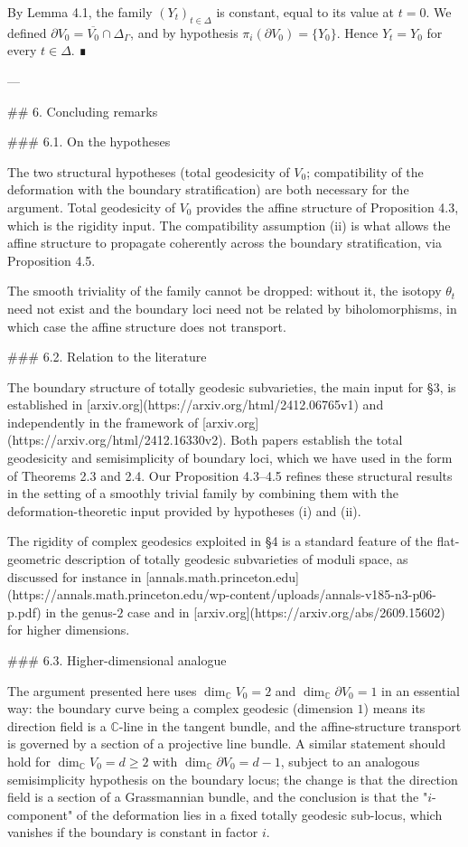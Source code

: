 By Lemma 4.1, the family $(Y_t)_{t \in \Delta}$ is constant, equal to its value at $t = 0$. We defined $\partial V_0 = \overline{V_0} \cap \Delta_\Gamma$, and by hypothesis $\pi_i(\partial V_0) = \{Y_0\}$. Hence $Y_t = Y_0$ for every $t \in \Delta$. ∎

---

## 6. Concluding remarks

### 6.1. On the hypotheses

The two structural hypotheses (total geodesicity of $V_0$; compatibility of the deformation with the boundary stratification) are both necessary for the argument. Total geodesicity of $V_0$ provides the affine structure of Proposition 4.3, which is the rigidity input. The compatibility assumption (ii) is what allows the affine structure to propagate coherently across the boundary stratification, via Proposition 4.5.

The smooth triviality of the family cannot be dropped: without it, the isotopy $\theta_t$ need not exist and the boundary loci need not be related by biholomorphisms, in which case the affine structure does not transport.

### 6.2. Relation to the literature

The boundary structure of totally geodesic subvarieties, the main input for §3, is established in [arxiv.org](https://arxiv.org/html/2412.06765v1) and independently in the framework of [arxiv.org](https://arxiv.org/html/2412.16330v2). Both papers establish the total geodesicity and semisimplicity of boundary loci, which we have used in the form of Theorems 2.3 and 2.4. Our Proposition 4.3–4.5 refines these structural results in the setting of a smoothly trivial family by combining them with the deformation-theoretic input provided by hypotheses (i) and (ii).

The rigidity of complex geodesics exploited in §4 is a standard feature of the flat-geometric description of totally geodesic subvarieties of moduli space, as discussed for instance in [annals.math.princeton.edu](https://annals.math.princeton.edu/wp-content/uploads/annals-v185-n3-p06-p.pdf) in the genus-$2$ case and in [arxiv.org](https://arxiv.org/abs/2609.15602) for higher dimensions.

### 6.3. Higher-dimensional analogue

The argument presented here uses $\dim_{\mathbb{C}} V_0 = 2$ and $\dim_{\mathbb{C}} \partial V_0 = 1$ in an essential way: the boundary curve being a complex geodesic (dimension $1$) means its direction field is a $\mathbb{C}$-line in the tangent bundle, and the affine-structure transport is governed by a section of a projective line bundle. A similar statement should hold for $\dim_{\mathbb{C}} V_0 = d \geq 2$ with $\dim_{\mathbb{C}} \partial V_0 = d - 1$, subject to an analogous semisimplicity hypothesis on the boundary locus; the change is that the direction field is a section of a Grassmannian bundle, and the conclusion is that the "$i$-component" of the deformation lies in a fixed totally geodesic sub-locus, which vanishes if the boundary is constant in factor $i$.

